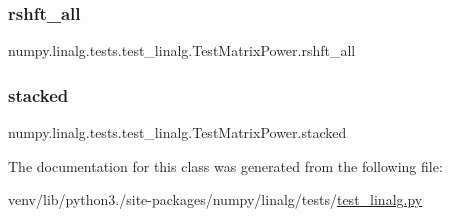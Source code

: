 \subsubsection{\texorpdfstring{rshft\+\_\+all}{rshft\_all}}
{\footnotesize\ttfamily numpy.\+linalg.\+tests.\+test\+\_\+linalg.\+Test\+Matrix\+Power.\+rshft\+\_\+all\hspace{0.3cm}{\ttfamily [static]}}

\mbox{\label{classnumpy_1_1linalg_1_1tests_1_1test__linalg_1_1TestMatrixPower_ae75e96e651214b12380413c80b6730c3}} 
\subsubsection{\texorpdfstring{stacked}{stacked}}
{\footnotesize\ttfamily numpy.\+linalg.\+tests.\+test\+\_\+linalg.\+Test\+Matrix\+Power.\+stacked\hspace{0.3cm}{\ttfamily [static]}}



The documentation for this class was generated from the following file\+:\begin{DoxyCompactItemize}
\item 
venv/lib/python3./site-\/packages/numpy/linalg/tests/\hyperlink{test__linalg_8py}{test\+\_\+linalg.\+py}\end{DoxyCompactItemize}
